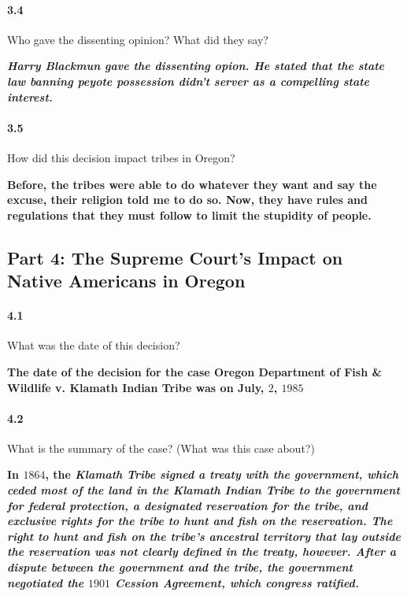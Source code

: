 
\paragraph{3.4} Who gave the dissenting opinion? What did they say?

\bf{\it{Harry Blackmun} gave the dissenting opion. He stated that the state law
banning peyote possession didn't server as a compelling state interest.}


\paragraph{3.5} How did this decision impact tribes in Oregon?

\bf{Before, the tribes were able to do whatever they want and say the excuse,
their religion told me to do so. Now, they have rules and regulations that they
must follow to limit the stupidity of people.}

\newpage

\subsection{Part 4: The Supreme Court’s Impact on Native Americans in Oregon}


\paragraph{4.1} What was the date of this decision?

\bf{The date of the decision for the case \bf{Oregon Department of Fish \&
    Wildlife v. Klamath Indian Tribe} was on July, $2$, $1985$}


\paragraph{4.2} What is the summary of the case? (What was this case about?)

\bf{In $1864$, the \it{Klamath Tribe} signed a treaty with the government, which
    ceded most of the land in the \it{Klamath Indian Tribe} to the government for
    federal protection, a designated reservation for the tribe, and exclusive rights
    for the tribe to hunt and fish on the reservation. The right to hunt and fish on
    the tribe’s ancestral territory that lay outside the reservation was not clearly
    defined in the treaty, however. After a dispute between the government and the
    tribe, the government negotiated the $1901$ Cession Agreement, which congress
    ratified.}

